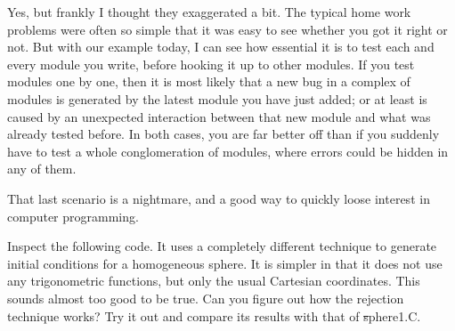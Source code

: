\carol
Yes, but frankly I thought they exaggerated a bit.  The typical home
work problems were often so simple that it was easy to see whether
you got it right or not.  But with our example today, I can see how
essential it is to test each and every module you write, before
hooking it up to other modules.  If you test modules one by one, then
it is most likely that a new bug in a complex of modules is generated
by the latest module you have just added; or at least is caused by an
unexpected interaction between that new module and what was already
tested before.  In both cases, you are far better off than if you
suddenly have to test a whole conglomeration of modules, where errors
could be hidden in any of them.

\alice
That last scenario is a nightmare, and a good way to quickly loose
interest in computer programming.

\cba

\begin{Exercise}\label{ex:rejectiontechnique}
Inspect the following code.  It uses a completely different technique
to generate initial conditions for a homogeneous sphere.  It is
simpler in that it does not use any trigonometric functions, but only
the usual Cartesian coordinates.  This sounds almost too good to be
true. Can you figure out how the rejection technique works?  Try it
out and compare its results with that of {\st sphere1.C}.
\end{Exercise}


